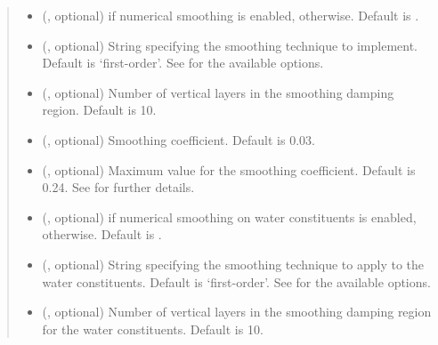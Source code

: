 \documentclass[letterpaper,10pt,english]{sphinxmanual}
\begin{document}
\begin{fulllineitems}
\begin{fulllineitems}
\begin{quote}
\begin{description}
\begin{itemize}
\item {} 
 (, optional) \textendash{}  if numerical smoothing is enabled,  otherwise. Default is .

\item {} 
 (, optional) \textendash{} String specifying the smoothing technique to implement. Default is ‘first-order’.
See {\hyperref[\detokenize{api:tasmania.dycore.horizontal_smoothing.HorizontalSmoothing}]{}} for the available options.

\item {} 
 (, optional) \textendash{} Number of vertical layers in the smoothing damping region. Default is 10.

\item {} 
 (, optional) \textendash{} Smoothing coefficient. Default is 0.03.

\item {} 
 (, optional) \textendash{} Maximum value for the smoothing coefficient. Default is 0.24.
See {\hyperref[\detokenize{api:tasmania.dycore.horizontal_smoothing.HorizontalSmoothing}]{}} for further details.

\item {} 
 (, optional) \textendash{}  if numerical smoothing on water constituents is enabled,  otherwise.
Default is .

\item {} 
 (, optional) \textendash{} String specifying the smoothing technique to apply to the water constituents. Default is ‘first-order’.
See {\hyperref[\detokenize{api:tasmania.dycore.horizontal_smoothing.HorizontalSmoothing}]{}} for the available options.

\item {} 
 (, optional) \textendash{} Number of vertical layers in the smoothing damping region for the water constituents. Default is 10.


\end{itemize}
\end{description}
\end{quote}
\end{fulllineitems}
\end{fulllineitems}
\end{document}
